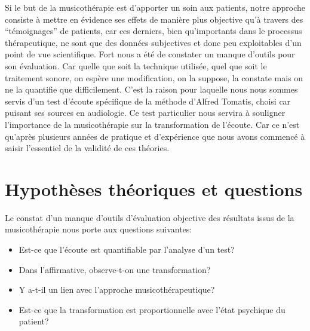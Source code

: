 Si le but de la musicothérapie est d'apporter un soin aux patients,
notre  approche consiste à mettre en évidence ses effets de manière
plus objective qu'à travers des ``témoignages'' de patients, car ces derniers, bien qu'importants dans le processus thérapeutique,
ne sont que des données subjectives et donc peu exploitables d'un
point de vue scientifique. Fort nous a été de
constater un manque d'outils pour son évaluation. Car quelle que soit la technique utilisée, quel que soit
le traitement sonore, on espère une modification, on la suppose, la constate
 mais
 on ne la quantifie que difficilement. C'est la raison pour laquelle
 nous nous sommes servis d'un test d'écoute
 spécifique de la méthode d'Alfred Tomatis, choisi car puisant ses
 sources en audiologie.
 Ce test particulier  nous servira à
 souligner l'importance de la musicothérapie 
 sur la transformation de l'écoute.
 Car ce n'est qu'après plusieurs
années de pratique et d'expérience que nous avons commencé à saisir
l'essentiel de la validité de ces théories.


 

  


\section {Hypothèses théoriques et questions}




   Le constat d'un manque
   d'outils d'évaluation objective des résultats issus de la
   musicothérapie  nous porte aux questions
   suivantes:  
\begin{itemize}
 \item Est-ce que l'écoute est quantifiable par
          l'analyse d'un test?
        \item Dans l'affirmative, observe-t-on une transformation?
         \item Y a-t-il  un lien avec l'approche musicothérapeutique?
  \item Est-ce que la transformation est proportionnelle avec l'état psychique du patient?
   \end{itemize}
 

